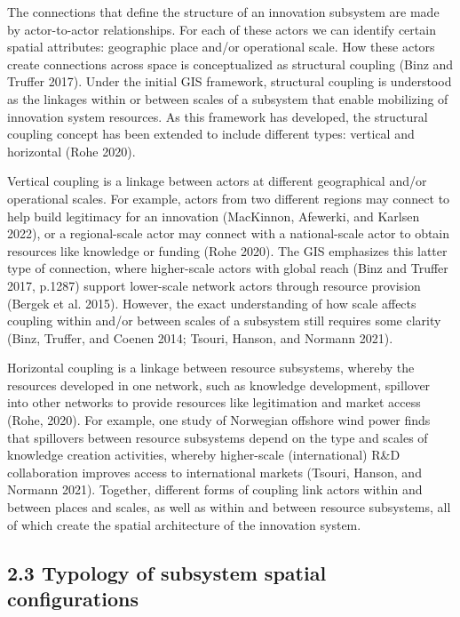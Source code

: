 \documentclass[twoside,12pt,final]{ucthesis-CA2012}
\begin{document}
\begin{ucmainmatter}
The connections that define the structure of an innovation subsystem are
made by actor-to-actor relationships. For each of these actors we can
identify certain spatial attributes: geographic place and/or operational
scale. How these actors create connections across space is
conceptualized as \textquotesingle structural coupling\textquotesingle{} (Binz and Truffer
2017). Under the initial
GIS framework, structural coupling is understood as the linkages within
or between scales of a subsystem that enable mobilizing of innovation
system resources. As this framework has developed, the structural
coupling concept has been extended to include different types: vertical
and horizontal (Rohe
2020).

Vertical coupling is a linkage between actors at different geographical
and/or operational scales. For example, actors from two different
regions may connect to help build legitimacy for an innovation
(MacKinnon, Afewerki, and Karlsen
2022), or a regional-scale
actor may connect with a national-scale actor to obtain resources like
knowledge or funding (Rohe
2020). The GIS emphasizes
this latter type of connection, where higher-scale actors \textquotesingle with global
reach\textquotesingle{} (Binz and Truffer 2017, p.1287) support lower-scale network
actors through resource provision (Bergek et al.
2015). However, the exact
understanding of how scale affects coupling within and/or between scales
of a subsystem still requires some clarity (Binz, Truffer, and Coenen
2014; Tsouri, Hanson, and Normann
2021).

Horizontal coupling is a linkage between resource subsystems, whereby
the resources developed in one network, such as knowledge development,
spillover into other networks to provide resources like legitimation and
market access (Rohe, 2020). For example, one study of Norwegian offshore
wind power finds that spillovers between resource subsystems depend on
the type and scales of knowledge creation activities, whereby
higher-scale (international) R\&D collaboration improves access to
international markets (Tsouri, Hanson, and Normann
2021). Together, different
forms of coupling link actors within and between places and scales, as
well as within and between resource subsystems, all of which create the
spatial architecture of the innovation system.

\hypertarget{typology-of-subsystem-spatial-configurations}{%
\subsection{2.3 Typology of subsystem spatial configurations}\label{typology-of-subsystem-spatial-configurations}}


\end{ucmainmatter}
\end{document}
